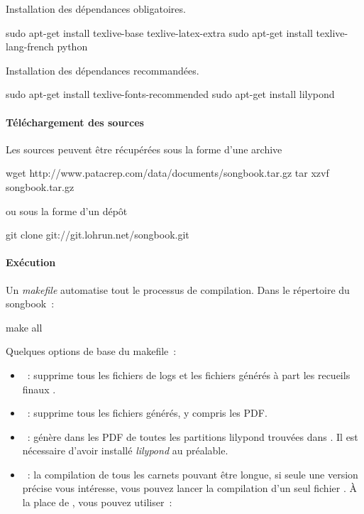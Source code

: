 Installation des dépendances obligatoires.
\begin{unix}
  sudo apt-get install texlive-base texlive-latex-extra
  sudo apt-get install texlive-lang-french python
\end{unix}

Installation des dépendances recommandées.
\begin{unix}
  sudo apt-get install texlive-fonts-recommended
  sudo apt-get install lilypond
\end{unix}

\paragraph{Téléchargement des sources}

Les sources peuvent être récupérées sous la forme d'une archive 
\begin{unix}
  wget http://www.patacrep.com/data/documents/songbook.tar.gz
  tar xzvf songbook.tar.gz
\end{unix}

ou sous la forme d'un dépôt \git

\begin{unix}
  git clone git://git.lohrun.net/songbook.git
\end{unix}

\paragraph{Exécution}

Un \emph{makefile} automatise tout le processus de compilation. 
Dans le répertoire du songbook~:

\begin{unix}
  make all
\end{unix}

Quelques options de base du makefile~:
\begin{itemize}
\item {}~: supprime tous les fichiers de logs et
  les fichiers générés à part les recueils finaux .
\item {}~: supprime tous les fichiers générés,
  y compris les PDF.
\item {}~: génère dans  les
  PDF de toutes les partitions lilypond  trouvées dans
  . Il est nécessaire d'avoir installé
  \emph{lilypond} au préalable.
\item {}~: la compilation de tous les carnets
  pouvant être longue, si seule une version précise vous intéresse,
  vous pouvez lancer la compilation d'un seul fichier . À la place
  de , vous pouvez utiliser~:
\end{itemize}

